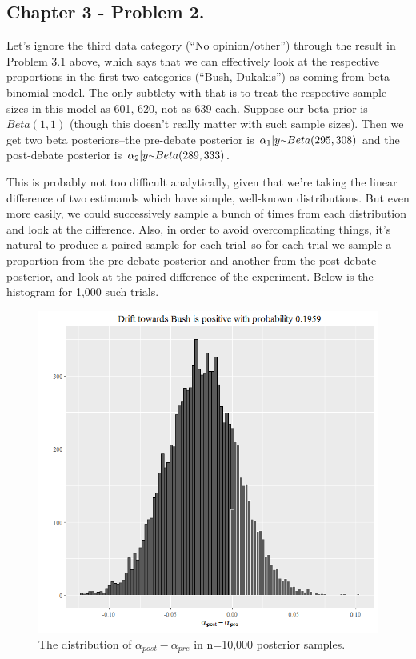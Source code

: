 \documentclass{article}
\newcommand{\mytilde}{\raise.17ex\hbox{$\scriptstyle\mathtt{\sim}$}}
\begin{document}
\subsection{Chapter 3 - Problem 2.}

Let's ignore the third data category (``No opinion/other'') through the result in Problem 3.1 above, which says that we can effectively
look at the respective proportions in the first two categories (``Bush, Dukakis'') as coming from beta-binomial model. The only subtlety with that is to treat the respective sample sizes in this model as 601, 620, not as 639 each. Suppose our beta prior is \(Beta(1,1)\) (though this doesn't really matter with such sample sizes). Then we get two beta posteriors--the pre-debate posterior is \(\alpha_1 \vert y \mytilde Beta(295, 308)\) and the post-debate posterior is \(\alpha_2 \vert y \mytilde Beta(289, 333)\).

This is probably not too difficult analytically, given that we're taking the linear difference of two estimands which have simple, well-known distributions. But even more easily, we could successively sample a bunch of times from each distribution and look at the difference. Also, in order to avoid overcomplicating things, it's natural to produce a paired sample for each trial--so for each trial we sample a proportion from the pre-debate posterior and another from the post-debate posterior, and look at the paired difference of the experiment. Below is the histogram for 1,000 such trials.

\begin{figure}[!ht]
  \caption{The distribution of \(\alpha_{post} - \alpha_{pre}\) in n=10,000 posterior samples.}
  \centering
    \includegraphics[width=\textwidth]{Problem32--Debate}
\end{figure}
\end{document}

